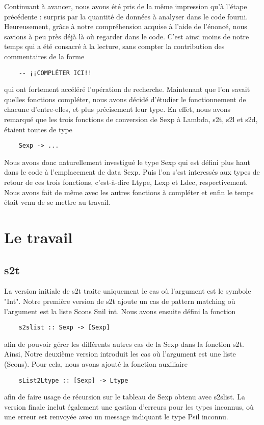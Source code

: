 \documentclass{article}
\begin{document}
Continuant à avancer, nous avons été pris de la même impression qu'à l'étape précédente : surpris par la quantité de données à analyser dans le code fourni.
Heureusement, grâce à notre compréhension acquise à l'aide de l'énoncé, nous savions à peu près déjà là où regarder dans le code.
C'est ainsi moins de notre temps qui a été consacré à la lecture, sans compter la contribution des commentaires de la forme
\begin{verbatim}
    -- ¡¡COMPLÉTER ICI!!
\end{verbatim}
qui ont fortement accéléré l'opération de recherche.
Maintenant que l'on savait quelles fonctions compléter, nous avons décidé d'étudier le fonctionnement de chacune d'entre-elles, et plus précisement leur type.
En effet, nous avons remarqué que les trois fonctions de conversion de Sexp à Lambda, s2t, s2l et s2d, étaient toutes de type
\begin{verbatim}
    Sexp -> ...
\end{verbatim}
Nous avons donc naturellement investigué le type Sexp qui est défini plus haut dans le code à l'emplacement de data Sexp.
Puis l'on s'est interessés aux types de retour de ces trois fonctions, c'est-à-dire Ltype, Lexp et Ldec, respectivement. Nous avons fait de même avec les autres fonctions à compléter et enfin le temps était venu de se mettre au travail.

\section{Le travail}

\subsection{s2t}
La version initiale de s2t traite uniquement le cas où l'argument est le symbole "Int". Notre première version de s2t ajoute un cas de pattern matching où l'argument est la liste Scons Snil int. Nous avons ensuite défini la fonction
\begin{verbatim}
    s2slist :: Sexp -> [Sexp]
\end{verbatim}
afin de pouvoir gérer les différents autres cas de la Sexp dans la fonction s2t. Ainsi, Notre deuxième version introduit les cas où l'argument est une liste (Scons). Pour cela, nous avons ajouté la fonction auxiliaire
\begin{verbatim}
    sList2Ltype :: [Sexp] -> Ltype
\end{verbatim}
afin de faire usage de récursion sur le tableau de Sexp obtenu avec s2slist.
La version finale inclut également une gestion d'erreurs pour les types inconnus, où une erreur est renvoyée avec un message indiquant le type Psil inconnu.
\end{document}

